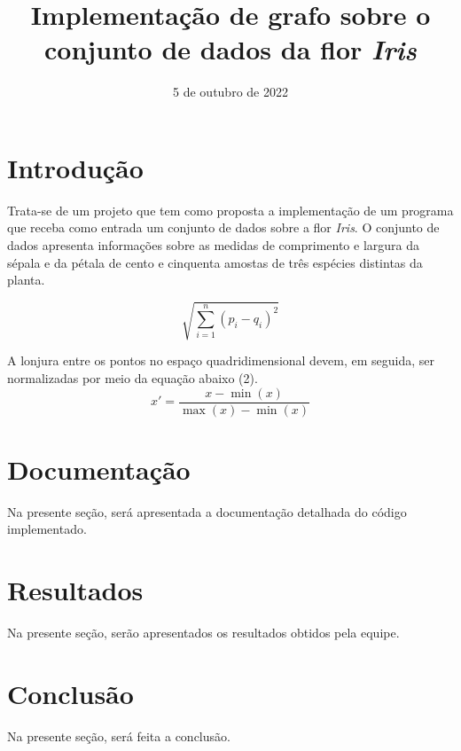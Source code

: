 \documentclass{article}
\title{Implementação de grafo sobre o conjunto de dados da flor {\it Iris\/}}
\author{\sc{Elian Babireski \& Vinícios Bidin}}
\date{5 de outubro de 2022}
\begin{document}
    \maketitle
    
    \section{Introdução}
        Trata-se de um projeto que tem como proposta a implementação de um programa que receba como entrada um conjunto de dados sobre a flor {\it Iris}. O conjunto de dados apresenta informações sobre as medidas de comprimento e largura da sépala e da pétala de cento e cinquenta amostas de três espécies distintas da planta.
    
        \begin{equation}
            \sqrt{\sum_{i = 1} ^ n {(p_i - q_i)} ^ 2}
        \end{equation}

        A lonjura entre os pontos no espaço quadridimensional devem, em seguida, ser normalizadas por meio da equação abaixo (2).
        \begin{equation}
            x' = \frac{x - \min(x)}{\max(x) - \min(x)}
        \end{equation}


    \section{Documentação}
        Na presente seção, será apresentada a documentação detalhada do código implementado.

    \section{Resultados}
        Na presente seção, serão apresentados os resultados obtidos pela equipe.
    
    \section{Conclusão}
        Na presente seção, será feita a conclusão.
\end{document}
